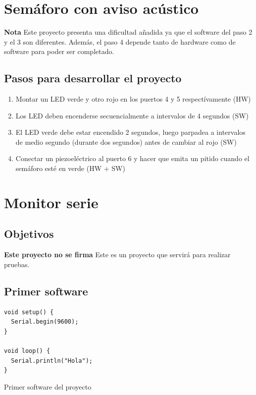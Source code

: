 \documentclass[11pt,spanish,a4paper]{article}
\begin{document}
\section{Semáforo con aviso acústico}

\textbf{Nota} Este proyecto presenta una dificultad añadida ya que el software del paso 2 y el 3
son diferentes. Además, el paso 4 depende tanto de hardware como de software para poder ser
completado.

\subsection{Pasos para desarrollar el proyecto}
\begin{enumerate}
	\item Montar un LED verde y otro rojo en los puertos 4 y 5 respectívamente (HW)
	\item Los LED deben encenderse secuencialmente a intervalos de 4 segundos (SW)
	\item El LED verde debe estar encendido 2 segundos, luego parpadea a intervalos de medio segundo
		(durante dos segundos) antes de cambiar al rojo (SW)
	\item Conectar un piezoeléctrico al puerto 6 y hacer que emita un pitido cuando el semáforo esté
		en verde (HW + SW)
\end{enumerate}

\section{Monitor serie}

\subsection{Objetivos}
\textbf{Este proyecto no se firma} Este es un proyecto que servirá para realizar pruebas.

\subsection{Primer software}

\begin{listing}[H]
\begin{verbatim}
void setup() {
  Serial.begin(9600);
}

void loop() {
  Serial.println("Hola");
}
\end{verbatim}
	\caption{Primer software del proyecto \thesection}
\end{listing}
\end{document}
